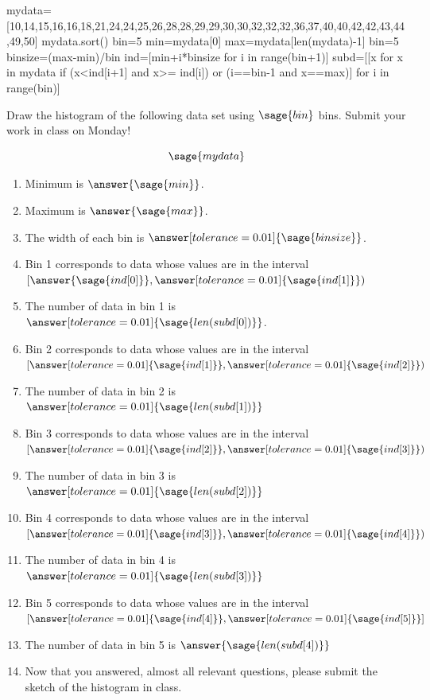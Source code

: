 \documentclass{ximera}
\begin{document}
\begin{problem}
\begin{sagesilent}
mydata=[10,14,15,16,16,18,21,24,24,25,26,28,28,29,29,30,30,32,32,32,36,37,40,40,42,42,43,44,49,50]
mydata.sort()
bin=5
min=mydata[0]
max=mydata[len(mydata)-1]
bin=5
binsize=(max-min)/bin
ind=[min+i*binsize for i in range(bin+1)]
subd=[[x for x in mydata if (x<ind[i+1] and x>= ind[i]) or (i==bin-1 and x==max)] for i in range(bin)]
\end{sagesilent}

Draw the histogram of the following data set using $\sage{bin}$ bins. Submit your work in class on Monday!

$$\sage{mydata}$$

\begin{enumerate}
    \item Minimum is $\answer{\sage{min}}$.
    \item Maximum is $\answer{\sage{max}}$.
    \item The width of each bin is $\answer[tolerance=0.01]{\sage{binsize}}$.
    \item Bin 1 corresponds to data whose values are in the interval 
    $[\answer{\sage{ind[0]}}, \answer[tolerance=0.01]{\sage{ind[1]}})$
    \item The number of data in bin 1 is $\answer[tolerance=0.01]{\sage{len(subd[0])}}$.
    \item Bin 2 corresponds to data whose values are in the interval 
    $[\answer[tolerance=0.01]{\sage{ind[1]}}, \answer[tolerance=0.01]{\sage{ind[2]}})$
    \item The number of data in bin 2 is $\answer[tolerance=0.01]{\sage{len(subd[1])}}$
    \item Bin 3 corresponds to data whose values are in the interval 
    $[\answer[tolerance=0.01]{\sage{ind[2]}}, \answer[tolerance=0.01]{\sage{ind[3]}})$
    \item The number of data in bin 3 is $\answer[tolerance=0.01]{\sage{len(subd[2])}}$
    \item Bin 4 corresponds to data whose values are in the interval 
    $[\answer[tolerance=0.01]{\sage{ind[3]}}, \answer[tolerance=0.01]{\sage{ind[4]}})$
    \item The number of data in bin 4 is $\answer[tolerance=0.01]{\sage{len(subd[3])}}$
    \item Bin 5 corresponds to data whose values are in the interval 
    $[\answer[tolerance=0.01]{\sage{ind[4]}}, \answer[tolerance=0.01]{\sage{ind[5]}}]$
    \item The number of data in bin 5 is $\answer{\sage{len(subd[4])}}$
    \item Now that you answered, almost all relevant questions, please submit the sketch of the histogram in class.
\end{enumerate}
\end{problem}
\end{document}
